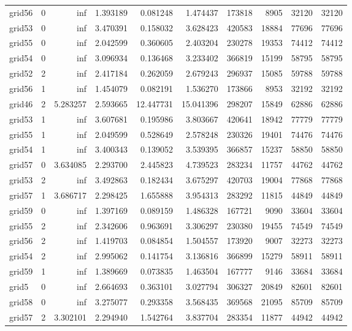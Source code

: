 \begin{longtable}{|l|r|r|r|r|r|r|r|r|r|}
grid56 & 0 & inf & 1.393189 & 0.081248 & 1.474437 & 173818 & 8905 & 32120 & 32120 \\
grid53 & 0 & inf & 3.470391 & 0.158032 & 3.628423 & 420583 & 18884 & 77696 & 77696 \\
grid55 & 0 & inf & 2.042599 & 0.360605 & 2.403204 & 230278 & 19353 & 74412 & 74412 \\
grid54 & 0 & inf & 3.096934 & 0.136468 & 3.233402 & 366819 & 15199 & 58795 & 58795 \\
grid52 & 2 & inf & 2.417184 & 0.262059 & 2.679243 & 296937 & 15085 & 59788 & 59788 \\
grid56 & 1 & inf & 1.454079 & 0.082191 & 1.536270 & 173866 & 8953 & 32192 & 32192 \\
grid46 & 2 & 5.283257 & 2.593665 & 12.447731 & 15.041396 & 298207 & 15849 & 62886 & 62886 \\
grid53 & 1 & inf & 3.607681 & 0.195986 & 3.803667 & 420641 & 18942 & 77779 & 77779 \\
grid55 & 1 & inf & 2.049599 & 0.528649 & 2.578248 & 230326 & 19401 & 74476 & 74476 \\
grid54 & 1 & inf & 3.400343 & 0.139052 & 3.539395 & 366857 & 15237 & 58850 & 58850 \\
grid57 & 0 & 3.634085 & 2.293700 & 2.445823 & 4.739523 & 283234 & 11757 & 44762 & 44762 \\
grid53 & 2 & inf & 3.492863 & 0.182434 & 3.675297 & 420703 & 19004 & 77868 & 77868 \\
grid57 & 1 & 3.686717 & 2.298425 & 1.655888 & 3.954313 & 283292 & 11815 & 44849 & 44849 \\
grid59 & 0 & inf & 1.397169 & 0.089159 & 1.486328 & 167721 & 9090 & 33604 & 33604 \\
grid55 & 2 & inf & 2.342606 & 0.963691 & 3.306297 & 230380 & 19455 & 74549 & 74549 \\
grid56 & 2 & inf & 1.419703 & 0.084854 & 1.504557 & 173920 & 9007 & 32273 & 32273 \\
grid54 & 2 & inf & 2.995062 & 0.141754 & 3.136816 & 366899 & 15279 & 58911 & 58911 \\
grid59 & 1 & inf & 1.389669 & 0.073835 & 1.463504 & 167777 & 9146 & 33684 & 33684 \\
grid5 & 0 & inf & 2.664693 & 0.363101 & 3.027794 & 306327 & 20849 & 82601 & 82601 \\
grid58 & 0 & inf & 3.275077 & 0.293358 & 3.568435 & 369568 & 21095 & 85709 & 85709 \\
grid57 & 2 & 3.302101 & 2.294940 & 1.542764 & 3.837704 & 283354 & 11877 & 44942 & 44942 \\

\end{longtable}
